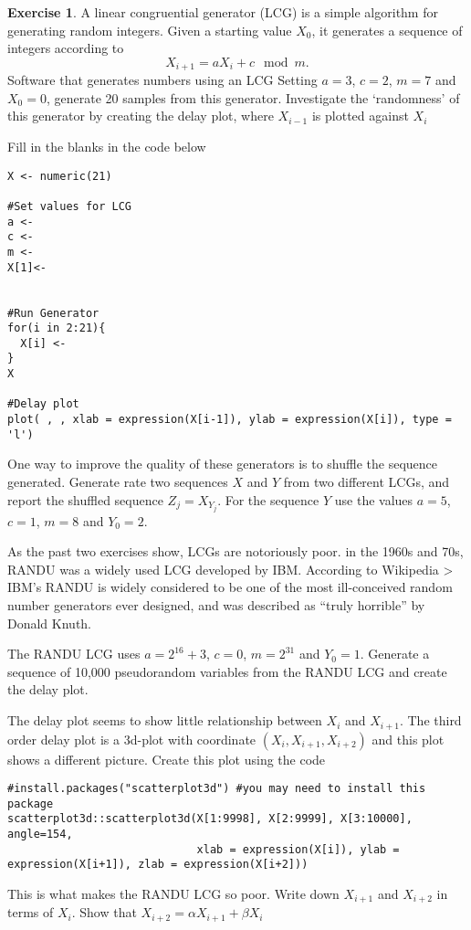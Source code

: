 \documentclass[
]{book}
\theoremstyle{definition}
\theoremstyle{definition}
\theoremstyle{definition}
\newtheorem{exercise}{Exercise}[chapter]
\theoremstyle{definition}
\theoremstyle{remark}
\begin{document}
\begin{exercise}
A linear congruential generator (LCG) is a simple algorithm for generating random integers. Given a starting value \(X_0\), it generates a sequence of integers according to
\[
X_{i+1} = a X_i + c \mod m.
\]
Software that generates numbers using an LCG Setting \(a = 3\), \(c = 2\), \(m = 7\) and \(X_0 = 0\), generate 20 samples from this generator. Investigate the `randomness' of this generator by creating the delay plot, where \(X_{i-1}\) is plotted against \(X_{i}\)

Fill in the blanks in the code below

\begin{verbatim}
X <- numeric(21)

#Set values for LCG
a <- 
c <- 
m <- 
X[1]<- 


#Run Generator
for(i in 2:21){
  X[i] <-
}
X

#Delay plot
plot( , , xlab = expression(X[i-1]), ylab = expression(X[i]), type = 'l')
\end{verbatim}

One way to improve the quality of these generators is to shuffle the sequence generated. Generate rate two sequences \(X\) and \(Y\) from two different LCGs, and report the shuffled sequence \(Z_j = X_{Y_j}\). For the sequence \(Y\) use the values \(a = 5\), \(c = 1\), \(m = 8\) and \(Y_0 = 2\).

As the past two exercises show, LCGs are notoriously poor. in the 1960s and 70s, RANDU was a widely used LCG developed by IBM. According to Wikipedia
\textgreater{} IBM's RANDU is widely considered to be one of the most ill-conceived random number generators ever designed, and was described as ``truly horrible'' by Donald Knuth.

The RANDU LCG uses \(a = 2^{16} + 3\), \(c = 0\), \(m = 2^{31}\) and \(Y_0 = 1\). Generate a sequence of 10,000 pseudorandom variables from the RANDU LCG and create the delay plot.

The delay plot seems to show little relationship between \(X_{i}\) and \(X_{i+1}\). The third order delay plot is a 3d-plot with coordinate \((X_i, X_{i+1}, X_{i+2})\) and this plot shows a different picture. Create this plot using the code

\begin{verbatim}
#install.packages("scatterplot3d") #you may need to install this package
scatterplot3d::scatterplot3d(X[1:9998], X[2:9999], X[3:10000], angle=154, 
                             xlab = expression(X[i]), ylab = expression(X[i+1]), zlab = expression(X[i+2]))
\end{verbatim}

This is what makes the RANDU LCG so poor. Write down \(X_{i+1}\) and \(X_{i+2}\) in terms of \(X_i\). Show that \(X_{i+2} = \alpha X_{i+1} + \beta X_{i}\)
\end{exercise}
\end{document}
